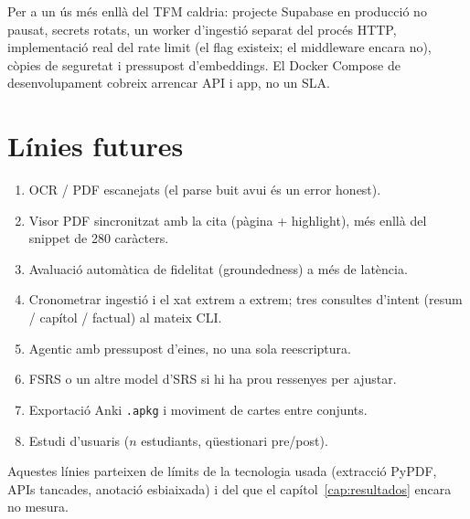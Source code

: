 Per a un ús més enllà del TFM caldria: projecte Supabase en producció no pausat, secrets rotats, un worker d'ingestió separat del procés HTTP, implementació real del rate limit (el flag existeix; el middleware encara no), còpies de seguretat i pressupost d'embeddings. El Docker Compose de desenvolupament cobreix arrencar API i app, no un SLA.

\section{Línies futures}

\begin{enumerate}
  \item OCR / PDF escanejats (el parse buit avui és un error honest).
  \item Visor PDF sincronitzat amb la cita (pàgina + highlight), més enllà del snippet de 280 caràcters.
  \item Avaluació automàtica de fidelitat (groundedness) a més de latència.
  \item Cronometrar ingestió i el xat extrem a extrem; tres consultes d'intent (resum / capítol / factual) al mateix CLI.
  \item Agentic amb pressupost d'eines, no una sola reescriptura.
  \item FSRS o un altre model d'SRS si hi ha prou ressenyes per ajustar.
  \item Exportació Anki \texttt{.apkg} i moviment de cartes entre conjunts.
  \item Estudi d'usuaris ($n$ estudiants, qüestionari pre/post).
\end{enumerate}

Aquestes línies parteixen de límits de la tecnologia usada (extracció PyPDF, APIs tancades, anotació esbiaixada) i del que el capítol~\ref{cap:resultados} encara no mesura.
